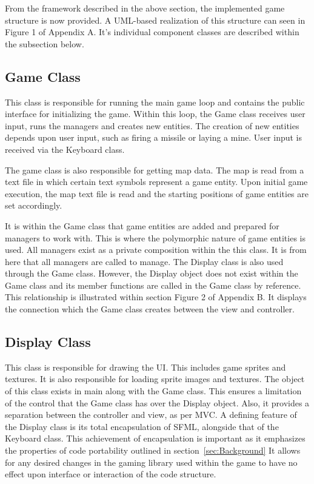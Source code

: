 \documentclass[10pt,twocolumn]{witseiepaper}
\begin{document}
From the framework described in the above section, the implemented game structure is now provided. A UML-based realization of this structure can seen in Figure 1 of Appendix A. It's individual component classes are described within the subsection below. 

\subsection{Game Class} 
This class is responsible for running the main game loop and contains the public interface for initializing the game. Within this loop, the Game class receives user input, runs the managers and creates new entities. The creation of new entities depends upon user input, such as firing a missile or laying a mine. User input is received via the Keyboard class.

The game class is also responsible for getting map data. The map is read from a text file in which certain text symbols represent a game entity. Upon initial game execution, the map text file is read and the starting positions of game entities are set accordingly. 

It is within the Game class that game entities are added and prepared for managers to work with. This is where the polymorphic nature of game entities is used. All managers exist as a private composition within the this class. It is from here that all managers are called to manage. The Display class is also used through the Game class. However, the Display object does not exist within the Game class and its member functions are called in the Game class by reference. This relationship is illustrated within section Figure 2 of Appendix B. It displays the connection which the Game class creates between the view and controller.  

\subsection{Display Class}
This class is responsible for drawing the UI. This includes game sprites and textures. It is also responsible for loading sprite images and textures. The object of this class exists in main along with the Game class. This ensures a limitation of the control that the Game class has over the Display object. Also, it provides a separation between the controller and view, as per MVC. A defining feature of the Display class is its total encapsulation of SFML, alongside that of the Keyboard class. This achievement of encapsulation is important as it emphasizes the properties of code portability outlined in section~\ref{sec:Background} It allows for any desired changes in the gaming library used within the game to have no effect upon interface or interaction of the code structure.  
\end{document}
